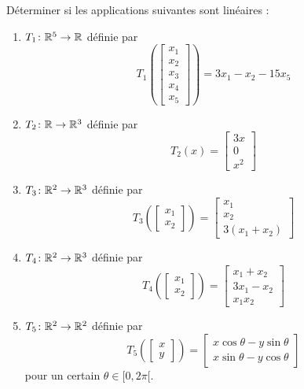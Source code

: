 \begin{exercice}
Déterminer si les applications suivantes sont linéaires :
\begin{enumerate}
    \item $T_1 \colon \mathbb{R}^5 \to \mathbb{R}$ définie par
    \[
        T_1 \left(\begin{bmatrix}x_1\\x_2\\x_3\\x_4\\x_5\end{bmatrix} \right) = 3x_1 - x_2 - 15x_5
    \]
    
    \item $T_2 \colon \mathbb{R} \to \mathbb{R}^3$ définie par
    \[
        T_2(x) = \begin{bmatrix}3x\\0\\x^2\end{bmatrix}
    \]
    
    \item $T_3 \colon \mathbb{R}^2 \to \mathbb{R}^3$ définie par
    \[
        T_3 \left(\begin{bmatrix}x_1\\x_2\end{bmatrix} \right) = \begin{bmatrix}x_1\\x_2\\3(x_1 + x_2)\end{bmatrix}
    \]
    
    \item $T_4 \colon \mathbb{R}^2 \to \mathbb{R}^3$ définie par
    \[
        T_4 \left(\begin{bmatrix}x_1\\x_2\end{bmatrix} \right) = \begin{bmatrix}x_1 + x_2\\3x_1 -x_2\\x_1 x_2\end{bmatrix}
    \]
    
    \item $T_5 \colon \mathbb{R}^2 \to \mathbb{R}^2$ définie par
    \[
        T_5 \left(\begin{bmatrix}x\\y\end{bmatrix} \right) = \begin{bmatrix}x\cos\theta-y\sin\theta\\x\sin\theta-y\cos\theta\end{bmatrix}
    \]
    pour un certain $\theta \in [0, 2\pi [$.
    

\end{enumerate}
\end{exercice}
